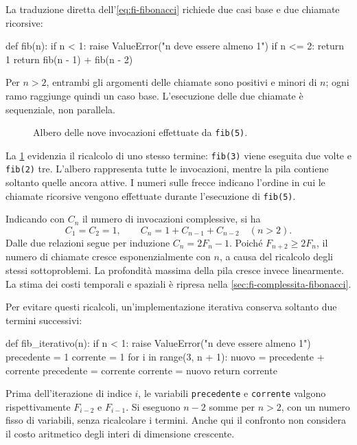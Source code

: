 La traduzione diretta dell'\cref{eq:fi-fibonacci} richiede due casi
base e due chiamate ricorsive:

\begin{unipdcode}[language=Python]
def fib(n):
    if n < 1:
        raise ValueError("n deve essere almeno 1")
    if n <= 2:
        return 1
    return fib(n - 1) + fib(n - 2)
\end{unipdcode}

Per \(n>2\), entrambi gli argomenti delle chiamate sono positivi e
minori di \(n\); ogni ramo raggiunge quindi un caso base.
L'esecuzione delle due chiamate è sequenziale, non parallela.

\begin{figure}[htbp]
  \centering
  
  \caption{Albero delle nove invocazioni effettuate da
  \texttt{fib(5)}.}
  \label{fig:fi-fibonacci-albero}
\end{figure}

La \cref{fig:fi-fibonacci-albero} evidenzia il ricalcolo di uno
stesso termine: \texttt{fib(3)} viene eseguita due volte e
\texttt{fib(2)} tre. L'albero rappresenta tutte le invocazioni,
mentre la pila contiene soltanto quelle ancora attive.
I numeri sulle frecce indicano l'ordine in cui le chiamate ricorsive
vengono effettuate durante l'esecuzione di \texttt{fib(5)}.

Indicando con \(C_n\) il numero di invocazioni complessive, si ha
\[
  C_1=C_2=1,\qquad C_n=1+C_{n-1}+C_{n-2}\quad(n>2).
\]
Dalle due relazioni segue per induzione \(C_n=2F_n-1\).
Poiché \(F_{n+2}\ge2F_n\), il numero di chiamate cresce
esponenzialmente con \(n\), a causa del ricalcolo degli stessi
sottoproblemi. La profondità massima della pila cresce invece
linearmente. La stima dei costi temporali e spaziali è ripresa nella
\cref{sec:fi-complessita-fibonacci}.

\clearpage

Per evitare questi ricalcoli, un'implementazione iterativa conserva
soltanto due termini successivi:

\begin{unipdcode}[language=Python]
def fib_iterativo(n):
    if n < 1:
        raise ValueError("n deve essere almeno 1")
    precedente = 1
    corrente = 1
    for i in range(3, n + 1):
        nuovo = precedente + corrente
        precedente = corrente
        corrente = nuovo
    return corrente
\end{unipdcode}

Prima dell'iterazione di indice \(i\), le variabili
\texttt{precedente} e \texttt{corrente} valgono rispettivamente
\(F_{i-2}\) e \(F_{i-1}\). Si eseguono \(n-2\) somme per \(n>2\),
con un numero fisso di variabili, senza ricalcolare i termini.
Anche qui il confronto non considera il costo aritmetico degli interi
di dimensione crescente.

